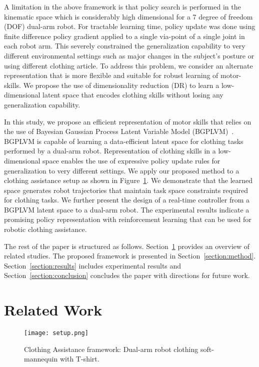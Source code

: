 \documentclass[a4paper]{article}
\begin{document}
A limitation in the above framework is that policy search is performed in the kinematic space which is considerably high dimensional for a 7 degree of freedom (DOF) dual-arm robot. For tractable learning time, policy update was done using finite difference policy gradient applied to a single via-point of a single joint in each robot arm. This severely constrained the generalization capability to very different environmental settings such as major changes in the subject's posture or using different clothing article. To address this problem, we consider an alternate representation that is more flexible and suitable for robust learning of motor-skills. We propose the use of dimensionality reduction (DR) to learn a low-dimensional latent space that encodes clothing skills without losing any generalization capability.

In this study, we propose an efficient representation of motor skills that relies on the use of Bayesian Gaussian Process Latent Variable Model (BGPLVM)~\cite{bgplvm}. BGPLVM is capable of learning a data-efficient latent space for clothing tasks performed by a dual-arm robot. Representation of clothing skills in a low-dimensional space enables the use of expressive policy update rules for generalization to very different settings. We apply our proposed method to a clothing assistance setup as shown in Figure~\ref{figure:setup}. We demonstrate that the learned space generates robot trajectories that maintain task space constraints required for clothing tasks. We further present the design of a real-time controller from a BGPLVM latent space to a dual-arm robot. The experimental results indicate a promising policy representation with reinforcement learning that can be used for robotic clothing assistance.

The rest of the paper is structured as follows. Section~\ref{section:literature} provides an overview of related studies. The proposed framework is presented in Section~\ref{section:method}. Section~\ref{section:results} includes experimental results and Section~\ref{section:conclusion} concludes the paper with directions for future work.

\section{Related Work}
\label{section:literature}

\begin{figure}[t]
  \centering
  \texttt{[image: setup.png]}
  \caption{Clothing Assistance framework: Dual-arm robot clothing soft-mannequin with T-shirt.}
  \label{figure:setup}
\end{figure}
\end{document}
